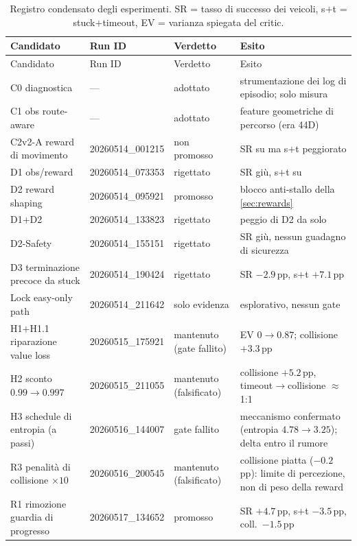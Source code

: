 \begin{small}
\begin{longtable}{@{}p{3.1cm}p{2.8cm}p{2.0cm}p{5.6cm}@{}}
  \caption{Registro condensato degli esperimenti. SR = tasso di
  successo dei veicoli, s$+$t = stuck$+$timeout, EV = varianza spiegata
  del critic.}
  \label{tab:registry}\\
  \toprule
  Candidato & Run ID & Verdetto & Esito \\
  \midrule
  \endfirsthead
  \toprule
  Candidato & Run ID & Verdetto & Esito \\
  \midrule
  \endhead
  C0 diagnostica & --- & adottato & strumentazione dei log di episodio; solo misura \\
  C1 obs route-aware & --- & adottato & feature geometriche di percorso (era 44D) \\
  C2v2-A reward di movimento & 20260514\_001215 & non promosso & SR su ma s$+$t peggiorato \\
  D1 obs/reward & 20260514\_073353 & rigettato & SR giù, s$+$t su \\
  D2 reward shaping & 20260514\_095921 & promosso & blocco anti-stallo della \cref{sec:rewards} \\
  D1$+$D2 & 20260514\_133823 & rigettato & peggio di D2 da solo \\
  D2-Safety & 20260514\_155151 & rigettato & SR giù, nessun guadagno di sicurezza \\
  D3 terminazione precoce da stuck & 20260514\_190424 & rigettato & SR $-2.9$\,pp, s$+$t $+7.1$\,pp \\
  Lock easy-only path & 20260514\_211642 & solo evidenza & esplorativo, nessun gate \\
  H1$+$H1.1 riparazione value loss & 20260515\_175921 & mantenuto (gate fallito) & EV $0 \to 0.87$; collisione $+3.3$\,pp \\
  H2 sconto $0.99 \to 0.997$ & 20260515\_211055 & mantenuto (falsificato) & collisione $+5.2$\,pp, timeout$\to$collisione $\approx$1:1 \\
  H3 schedule di entropia (a passi) & 20260516\_144007 & gate fallito & meccanismo confermato (entropia $4.78 \to 3.25$); delta entro il rumore \\
  R3 penalità di collisione $\times 10$ & 20260516\_200545 & mantenuto (falsificato) & collisione piatta ($-0.2$\,pp): limite di percezione, non di peso della reward \\
  R1 rimozione guardia di progresso & 20260517\_134652 & promosso & SR $+4.7$\,pp, s$+$t $-3.5$\,pp, coll.\ $-1.5$\,pp \\

\end{longtable}
\end{small}
